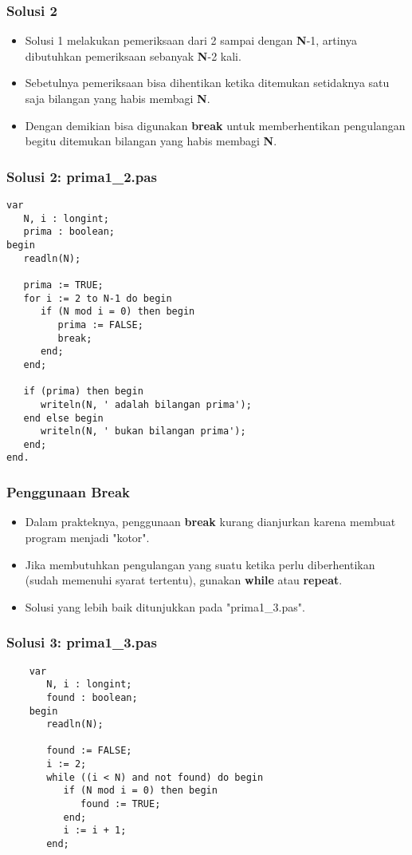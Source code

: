 \documentclass{beamer}
\begin{document}
\begin{frame}
\frametitle{Solusi 2}
\begin{itemize}
	\item Solusi 1 melakukan pemeriksaan dari 2 sampai dengan \textbf{N}-1, artinya dibutuhkan pemeriksaan sebanyak \textbf{N}-2 kali.
	\item Sebetulnya pemeriksaan bisa dihentikan ketika ditemukan setidaknya satu saja bilangan yang habis membagi \textbf{N}.
	\item Dengan demikian bisa digunakan \textbf{break} untuk memberhentikan pengulangan begitu ditemukan bilangan yang habis membagi \textbf{N}.
\end{itemize}
\end{frame}

\begin{frame}[fragile]
\frametitle{Solusi 2: prima1\_2.pas}
\begin{lstlisting}
var
   N, i : longint;
   prima : boolean;
begin
   readln(N);

   prima := TRUE;
   for i := 2 to N-1 do begin
      if (N mod i = 0) then begin
         prima := FALSE;
         break;
      end;
   end;

   if (prima) then begin
      writeln(N, ' adalah bilangan prima');
   end else begin
      writeln(N, ' bukan bilangan prima');
   end;
end.
\end{lstlisting}
\end{frame}

\begin{frame}
\frametitle{Penggunaan Break}
\begin{itemize}
	\item Dalam prakteknya, penggunaan \textbf{break} kurang dianjurkan karena membuat program menjadi "kotor".
	\item Jika membutuhkan pengulangan yang suatu ketika perlu diberhentikan (sudah memenuhi syarat tertentu), gunakan \textbf{while} atau \textbf{repeat}.
	\item Solusi yang lebih baik ditunjukkan pada "prima1\_3.pas".
\end{itemize}
\end{frame}

\begin{frame}[fragile]
\frametitle{Solusi 3: prima1\_3.pas}
\begin{lstlisting}
	var
	   N, i : longint;
	   found : boolean;
	begin
	   readln(N);

	   found := FALSE;
	   i := 2;
	   while ((i < N) and not found) do begin
	      if (N mod i = 0) then begin
	         found := TRUE;
	      end;
	      i := i + 1;
	   end;
\end{lstlisting}
\end{frame}
\end{document}
